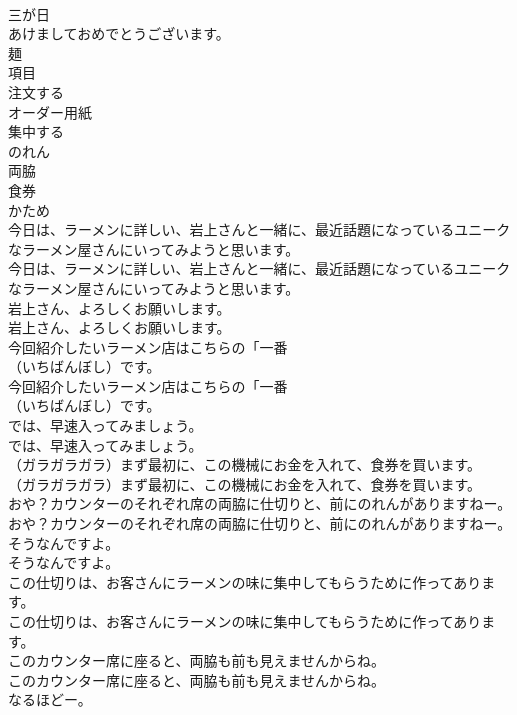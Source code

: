 \documentclass[8pt]{extreport}
\begin{document}
\begin{CJK}{UTF8}{min}
\\	三が日
\\	あけましておめでとうございます。
\\	麺
\\	項目
\\	注文する
\\	オーダー用紙
\\	集中する
\\	のれん
\\	両脇
\\	食券
\\	かため
\\	今日は、ラーメンに詳しい、岩上さんと一緒に、最近話題になっているユニークなラーメン屋さんにいってみようと思います。	
\\	今日は、ラーメンに詳しい、岩上さんと一緒に、最近話題になっているユニークなラーメン屋さんにいってみようと思います。 
\\	岩上さん、よろしくお願いします。	
\\	岩上さん、よろしくお願いします。 
\\	今回紹介したいラーメン店はこちらの「一番
\\	（いちばんぼし）です。	
\\	今回紹介したいラーメン店はこちらの「一番
\\	（いちばんぼし）です。 
\\	では、早速入ってみましょう。	
\\	では、早速入ってみましょう。 
\\	（ガラガラガラ）まず最初に、この機械にお金を入れて、食券を買います。	
\\	（ガラガラガラ）まず最初に、この機械にお金を入れて、食券を買います。 
\\	おや？カウンターのそれぞれ席の両脇に仕切りと、前にのれんがありますねー。	
\\	おや？カウンターのそれぞれ席の両脇に仕切りと、前にのれんがありますねー。 
\\	そうなんですよ。	
\\	そうなんですよ。 
\\	この仕切りは、お客さんにラーメンの味に集中してもらうために作ってあります。	
\\	この仕切りは、お客さんにラーメンの味に集中してもらうために作ってあります。 
\\	このカウンター席に座ると、両脇も前も見えませんからね。	
\\	このカウンター席に座ると、両脇も前も見えませんからね。 
\\	なるほどー。	

\end{CJK}
\end{document}
